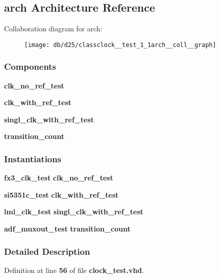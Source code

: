 \subsection{arch Architecture Reference}
\label{classclock__test_1_1arch}


Collaboration diagram for arch\+:\nopagebreak
\begin{figure}[H]
\begin{center}
\leavevmode
\texttt{[image: db/d25/classclock\_\_test\_1\_1arch\_\_coll\_\_graph]}
\end{center}
\end{figure}
\subsubsection*{Components}
 \begin{DoxyCompactItemize}
\item 
{\bf clk\+\_\+no\+\_\+ref\+\_\+test}  {\bfseries }  
\item 
{\bf clk\+\_\+with\+\_\+ref\+\_\+test}  {\bfseries }  
\item 
{\bf singl\+\_\+clk\+\_\+with\+\_\+ref\+\_\+test}  {\bfseries }  
\item 
{\bf transition\+\_\+count}  {\bfseries }  
\end{DoxyCompactItemize}
\subsubsection*{Instantiations}
 \begin{DoxyCompactItemize}
\item 
{\bf fx3\+\_\+clk\+\_\+test}  {\bfseries clk\+\_\+no\+\_\+ref\+\_\+test}   
\item 
{\bf si5351c\+\_\+test}  {\bfseries clk\+\_\+with\+\_\+ref\+\_\+test}   
\item 
{\bf lml\+\_\+clk\+\_\+test}  {\bfseries singl\+\_\+clk\+\_\+with\+\_\+ref\+\_\+test}   
\item 
{\bf adf\+\_\+muxout\+\_\+test}  {\bfseries transition\+\_\+count}   
\end{DoxyCompactItemize}


\subsubsection{Detailed Description}


Definition at line {\bf 56} of file {\bf clock\+\_\+test.\+vhd}.



